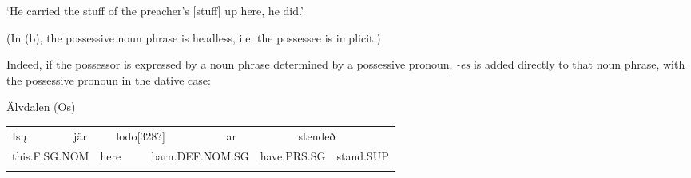 \begin{styleTranslation}
‘He carried the stuff of the preacher’s [stuff] up here, he did.’

\end{styleTranslation}

\begin{styleBodyTextFirst}
(In (b), the possessive noun phrase is headless, i.e. the possessee is implicit.) 

\end{styleBodyTextFirst}

\begin{styleBodytextC}
Indeed, if the possessor is expressed by a noun phrase determined by a possessive pronoun,\textit{ -}\textit{es} is added directly to that noun phrase, with the possessive pronoun in the dative case:

\end{styleBodytextC}


\begin{listWWNumileveli}
\item 

\begin{styleExample}
Älvdalen (Os)

\end{styleExample}

\end{listWWNumileveli}

\begin{listWWNumlxxviiileveli}
\item 

\end{listWWNumlxxviiileveli}

\begin{tabular}{llllllllll}
\lsptoprule
Is\k{u} & \multicolumn{2}{l}{jär

} & \multicolumn{2}{l}{lodo[328?]

} & \multicolumn{2}{l}{ar

} & \multicolumn{2}{l}{stendeð

} & \\
\multicolumn{2}{l}{this.F.SG.NOM

} & \multicolumn{2}{l}{here

} & \multicolumn{2}{l}{barn.DEF.NOM.SG

} & \multicolumn{2}{l}{have.PRS.SG

} & \multicolumn{2}{l}{stand.SUP

}\\
\lspbottomrule
\end{tabular}

